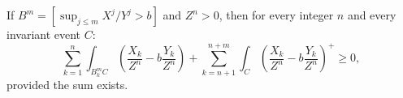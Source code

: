 If $B^m = [\sup_{j \leq m} X^j/Y^j > b]$ and $Z^n > 0$, then for every integer $n$ and every invariant event $C$: $$\sum_{k=1}^{n} \int_{B_k^m C} \left( \frac{X_k}{Z^n} - b \frac{Y_k}{Z^n} \right) + \sum_{k=n+1}^{n+m} \int_C \left( \frac{X_k}{Z^n} - b \frac{Y_k}{Z^n} \right)^+ \geq 0,$$ provided the sum exists.
